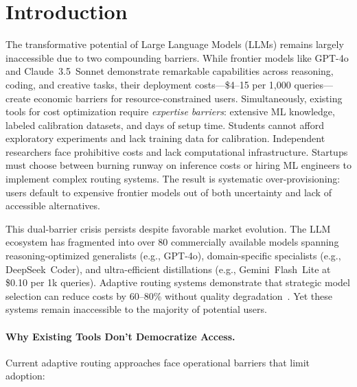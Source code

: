 
\section{Introduction}
\label{sec:introduction}

The transformative potential of Large Language Models (LLMs) remains largely inaccessible due to two compounding barriers. While frontier models like GPT-4o and Claude~3.5~Sonnet demonstrate remarkable capabilities across reasoning, coding, and creative tasks, their deployment costs---\$4--15 per 1,000 queries---create economic barriers for resource-constrained users. Simultaneously, existing tools for cost optimization require \emph{expertise barriers}: extensive ML knowledge, labeled calibration datasets, and days of setup time. Students cannot afford exploratory experiments and lack training data for calibration. Independent researchers face prohibitive costs and lack computational infrastructure. Startups must choose between burning runway on inference costs or hiring ML engineers to implement complex routing systems. The result is systematic over-provisioning: users default to expensive frontier models out of both uncertainty and lack of accessible alternatives.

This dual-barrier crisis persists despite favorable market evolution. The LLM ecosystem has fragmented into over 80 commercially available models spanning reasoning-optimized generalists (e.g., GPT-4o), domain-specific specialists (e.g., DeepSeek~Coder), and ultra-efficient distillations (e.g., Gemini~Flash~Lite at \$0.10 per 1k queries). Adaptive routing systems demonstrate that strategic model selection can reduce costs by 60--80\% without quality degradation~\cite{chen2023frugalgpt,ong2024routellm}. Yet these systems remain inaccessible to the majority of potential users.

\paragraph{Why Existing Tools Don't Democratize Access.} Current adaptive routing approaches face operational barriers that limit adoption:


